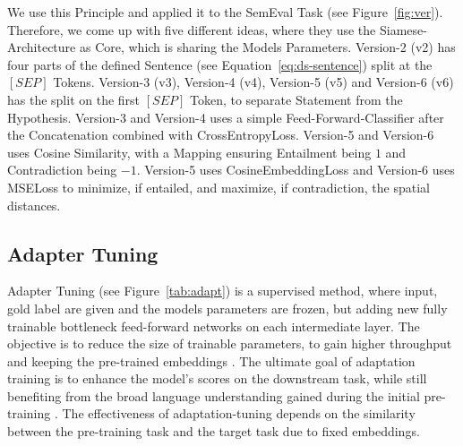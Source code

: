 We use this Principle and applied it to the SemEval Task (see Figure~\ref{fig:ver}). 
Therefore, we come up with five different ideas, where they use the Siamese-Architecture as Core, 
which is sharing the Models Parameters. Version-2 (v2) has four
parts of the defined Sentence (see Equation~\ref{eq:ds-sentence}) split at the $[SEP]$ Tokens.
Version-3 (v3), Version-4 (v4), Version-5 (v5) and Version-6 (v6) has the split on the first $[SEP]$ Token, to separate Statement from the Hypothesis.
Version-3 and Version-4 uses a simple Feed-Forward-Classifier after the Concatenation combined with CrossEntropyLoss.
Version-5 and Version-6 uses Cosine Similarity, with a Mapping ensuring Entailment being $1$ and
Contradiction being $-1$. Version-5 uses CosineEmbeddingLoss and Version-6 uses MSELoss to 
minimize, if entailed, and maximize, if contradiction, the spatial distances.


















\subsection{Adapter Tuning}

Adapter Tuning (see Figure~\ref{tab:adapt}) is a supervised method, where input, gold label are given and the models parameters are frozen, 
but adding new fully trainable bottleneck feed-forward networks 
on each intermediate layer. The objective is to reduce the size of trainable parameters, 
to gain higher throughput and keeping the pre-trained embeddings\cite{zheng_learn_2023} \cite{naveed_comprehensive_2023}. 
The ultimate goal of adaptation training is to enhance the model's scores on the downstream task, 
while still benefiting from the broad language understanding gained during the initial 
pre-training \cite{manjavacas_adapting_2022}. The effectiveness of adaptation-tuning depends on 
the similarity between the pre-training task and the target task due to fixed embeddings.


